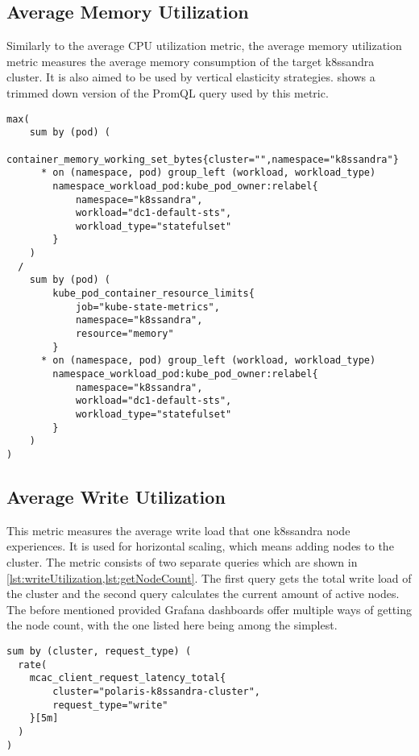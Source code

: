 \subsection{Average Memory Utilization}

Similarly to the average CPU utilization metric, the average memory utilization metric measures the average memory consumption of the target k8ssandra cluster. It is also aimed to be used by vertical elasticity strategies.  shows a trimmed down version of the PromQL query used by this metric.

\begin{lstlisting}[caption={PromQL query used for the average memory utilization metric},
                    captionpos=b,
                    label=lst:avgMemoryUtilization,
                    float]
max(
    sum by (pod) (
        container_memory_working_set_bytes{cluster="",namespace="k8ssandra"}
      * on (namespace, pod) group_left (workload, workload_type)
        namespace_workload_pod:kube_pod_owner:relabel{
            namespace="k8ssandra",
            workload="dc1-default-sts",
            workload_type="statefulset"
        }
    )
  /
    sum by (pod) (
        kube_pod_container_resource_limits{
            job="kube-state-metrics",
            namespace="k8ssandra",
            resource="memory"
        }
      * on (namespace, pod) group_left (workload, workload_type)
        namespace_workload_pod:kube_pod_owner:relabel{
            namespace="k8ssandra",
            workload="dc1-default-sts",
            workload_type="statefulset"
        }
    )
)
\end{lstlisting}

\subsection{Average Write Utilization}
\label{sec:metrics-average-write-utilization}

This metric measures the average write load that one k8ssandra node experiences. It is used for horizontal scaling, which means adding nodes to the cluster. The metric consists of two separate queries which are shown in \cref{lst:writeUtilization,lst:getNodeCount}. The first query gets the total write load of the cluster and the second query calculates the current amount of active nodes. The before mentioned provided Grafana dashboards offer multiple ways of getting the node count, with the one listed here being among the simplest.

\begin{lstlisting}[caption={PromQL query used to get the current write throughput},
                    captionpos=b,
                    label=lst:writeUtilization,
                    float]
sum by (cluster, request_type) (
  rate(
    mcac_client_request_latency_total{
        cluster="polaris-k8ssandra-cluster",
        request_type="write"
    }[5m]
  )
)
\end{lstlisting}

